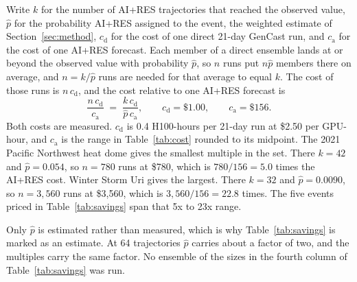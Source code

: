 \documentclass[11pt]{article}
\begin{document}
Write $k$ for the number of AI+RES trajectories that reached the observed value, $\hat{p}$ for the
probability AI+RES assigned to the event, the weighted estimate of Section~\ref{sec:method},
$c_{\mathrm{d}}$ for the cost of one direct 21-day GenCast run, and $c_{\mathrm{a}}$ for the cost
of one AI+RES forecast. Each member of a direct ensemble lands at
or beyond the observed value with probability $\hat{p}$, so $n$ runs put $n\hat{p}$ members there
on average, and $n = k/\hat{p}$ runs are needed for that average to equal $k$. The cost of those
runs is $n\,c_{\mathrm{d}}$, and the cost relative to one AI+RES forecast is
%
\begin{equation}
\frac{n\,c_{\mathrm{d}}}{c_{\mathrm{a}}} \;=\; \frac{k\,c_{\mathrm{d}}}{\hat{p}\,c_{\mathrm{a}}},
\qquad c_{\mathrm{d}} = \$1.00, \qquad c_{\mathrm{a}} = \$156 .
\label{eq:multiple}
\end{equation}
%
Both costs are measured. $c_{\mathrm{d}}$ is 0.4 H100-hours per 21-day run at \$2.50 per GPU-hour,
and $c_{\mathrm{a}}$ is the range in Table~\ref{tab:cost} rounded to its midpoint. The 2021 Pacific Northwest
heat dome gives the smallest multiple in the set. There $k = 42$ and $\hat{p} = 0.054$, so
$n = 780$ runs at \$780, which is $780/156 = 5.0$ times the AI+RES cost. Winter Storm Uri gives
the largest. There $k = 32$ and $\hat{p} = 0.0090$, so $n = 3{,}560$ runs at \$3,560, which is
$3{,}560/156 = 22.8$ times. The five events priced in Table~\ref{tab:savings} span that 5x to 23x
range.

Only $\hat{p}$ is estimated rather than measured, which is why Table~\ref{tab:savings} is marked
as an estimate. At 64 trajectories $\hat{p}$ carries about a factor of two, and the multiples
carry the same factor. No ensemble of the sizes in the fourth column of Table~\ref{tab:savings}
was run.
\end{document}
